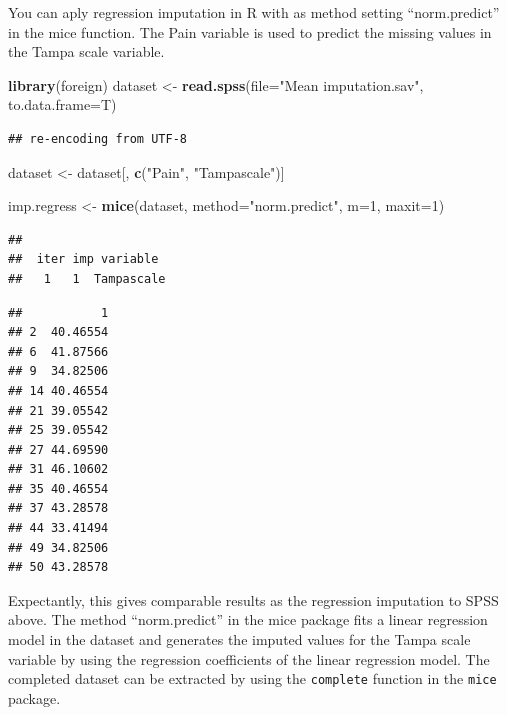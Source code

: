 \documentclass[
]{book}
\newenvironment{Shaded}{\begin{snugshade}}{\end{snugshade}}
\newcommand{\CommentTok}[1]{\textcolor[rgb]{0.56,0.35,0.01}{\textit{#1}}}
\newcommand{\DataTypeTok}[1]{\textcolor[rgb]{0.13,0.29,0.53}{#1}}
\newcommand{\DecValTok}[1]{\textcolor[rgb]{0.00,0.00,0.81}{#1}}
\newcommand{\KeywordTok}[1]{\textcolor[rgb]{0.13,0.29,0.53}{\textbf{#1}}}
\newcommand{\NormalTok}[1]{#1}
\newcommand{\OperatorTok}[1]{\textcolor[rgb]{0.81,0.36,0.00}{\textbf{#1}}}
\newcommand{\StringTok}[1]{\textcolor[rgb]{0.31,0.60,0.02}{#1}}
\begin{document}
You can aply regression imputation in R with as method setting
``norm.predict'' in the mice function. The Pain variable is used to
predict the missing values in the Tampa scale variable.

\begin{Shaded}
\begin{Highlighting}[]
\KeywordTok{library}\NormalTok{(foreign)}
\NormalTok{dataset <-}\StringTok{ }\KeywordTok{read.spss}\NormalTok{(}\DataTypeTok{file=}\StringTok{"Mean imputation.sav"}\NormalTok{, }\DataTypeTok{to.data.frame=}\NormalTok{T)}
\end{Highlighting}
\end{Shaded}

\begin{verbatim}
## re-encoding from UTF-8
\end{verbatim}

\begin{Shaded}
\begin{Highlighting}[]
\NormalTok{dataset <-}\StringTok{ }\NormalTok{dataset[, }\KeywordTok{c}\NormalTok{(}\StringTok{"Pain"}\NormalTok{, }\StringTok{"Tampascale"}\NormalTok{)]}

\NormalTok{imp.regress <-}\StringTok{ }\KeywordTok{mice}\NormalTok{(dataset, }\DataTypeTok{method=}\StringTok{"norm.predict"}\NormalTok{, }\DataTypeTok{m=}\DecValTok{1}\NormalTok{, }\DataTypeTok{maxit=}\DecValTok{1}\NormalTok{)}
\end{Highlighting}
\end{Shaded}

\begin{verbatim}
## 
##  iter imp variable
##   1   1  Tampascale
\end{verbatim}

\begin{Shaded}
\end{Shaded}

\begin{verbatim}
##           1
## 2  40.46554
## 6  41.87566
## 9  34.82506
## 14 40.46554
## 21 39.05542
## 25 39.05542
## 27 44.69590
## 31 46.10602
## 35 40.46554
## 37 43.28578
## 44 33.41494
## 49 34.82506
## 50 43.28578
\end{verbatim}

Expectantly, this gives comparable results as the regression imputation
to SPSS above. The method ``norm.predict'' in the mice package fits a
linear regression model in the dataset and generates the imputed values
for the Tampa scale variable by using the regression coefficients of the
linear regression model. The completed dataset can be extracted by using
the \texttt{complete} function in the \texttt{mice} package.
\end{document}
